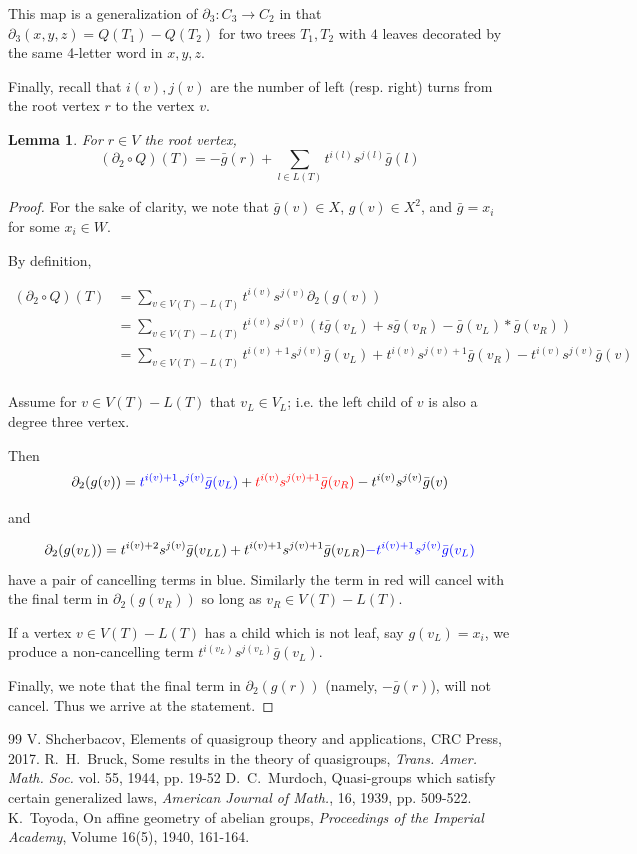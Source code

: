 \documentclass[10pt,a4paper]{amsart}
\newtheorem{lemma}[theorem]{Lemma}
\theoremstyle{definition}
\begin{document}
This map is a generalization of $\partial_3: C_3 \to C_2$ in that 
$\partial_3(x,y,z) = Q(T_1) - Q(T_2)$ for two trees $T_1, T_2$ with $4$ leaves decorated by the same 4-letter word in $x,y,z$. 

Finally, recall that $i(v), j(v)$ are the number of left (resp. right) turns from the root vertex $r$ to the vertex $v.$ 


\begin{lemma}
    For  $r \in V$ the root vertex,
    \[ (\partial_2 \circ Q)(T) = - \bar{g}(r) + \sum_{l \in L(T)} t^{i(l)} s^{j(l)}\bar{g}(l) \]
\end{lemma}

\begin{proof}
    For the sake of clarity, we note that $\bar g (v) \in X$, $g(v) \in X^2$, and $\bar g = x_i$ for some $x_i \in W$.


By definition, 

\begin{align*}
    (\partial_2 \circ Q)(T) & = \sum_{v \in V(T)-L(T)} t^{i(v)}s^{j(v)} \partial_2(g(v)) \\
    & = \sum_{v \in V(T)-L(T)} t^{i(v)}s^{j(v)} (t \bar g(v_L) + s \bar g (v_R) - \bar g(v_L) * \bar g(v_R)) \\
     & = \sum_{v \in V(T)-L(T)} t^{i(v) +1}s^{j(v)} \bar g(v_L) + t^{i(v)}s^{j(v)+1} \bar g (v_R) - t^{i(v)}s^{j(v)}  \bar g(v) \\
\end{align*}

Assume for $v \in V(T)- L(T)$ that $v_L \in V_L$; i.e. the left child of $v$ is also a degree three vertex.

Then 
\[ \partial_2(g(v)) = {\color{blue} t^{i(v) +1}s^{j(v)} \bar g(v_L)} + {\color{red} t^{i(v)}s^{j(v)+1} \bar g (v_R) } - t^{i(v)}s^{j(v)}  \bar g(v)\]

 and 
 
\[ \partial_2(g(v_L)) = t^{i(v) +2}s^{j(v)} \bar g(v_{LL}) + t^{i(v)+1}s^{j(v)+1} \bar g (v_{LR}) {\color{blue} - t^{i(v)+1}s^{j(v)}  \bar g(v_L) } \]
 have a pair of cancelling terms in blue. Similarly the term in red will cancel with the final term in $\partial_2(g(v_R))$ so long as $v_R \in V(T)- L(T)$. 


If a vertex $v \in V(T)-L(T)$ has a child which is not leaf, say $g(v_L) = x_i$, we produce a non-cancelling term  $t^{i(v_L)} s^{j(v_L)} \bar g(v_L)$. 

Finally, we note that the final term in $\partial_2(g(r))$ (namely, $-\bar{g}(r)$), will not cancel. Thus we arrive at the statement.
\end{proof}

\begin{thebibliography}{99}
 V. Shcherbacov, Elements of quasigroup theory and applications,
CRC Press, 2017.
 R.~H.~Bruck, Some results in the theory of quasigroups, {\it Trans. Amer. Math. Soc.} vol. 55, 1944, pp. 19-52
 D.~C.~Murdoch,
Quasi-groups which satisfy certain generalized laws, {\it American
Journal of Math.}, 16, 1939, pp. 509-522.
 K.~Toyoda,
On affine geometry of abelian groups,
{\it Proceedings of the Imperial Academy}, Volume 16(5),  1940, 161-164.
\end{thebibliography}
\end{document}
